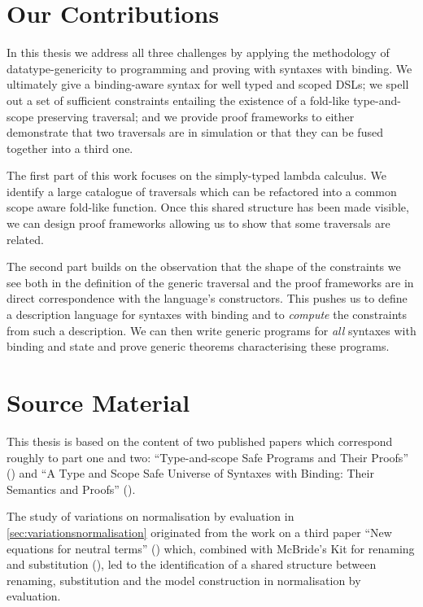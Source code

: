 \section{Our Contributions}

In this thesis we address all three challenges by applying the methodology of
datatype-genericity to programming and proving with syntaxes with binding.
We ultimately give a binding-aware syntax for well typed and scoped DSLs; we
spell out a set of sufficient constraints entailing the existence of a fold-like
type-and-scope preserving traversal; and we provide proof frameworks
to either demonstrate that two traversals are in simulation or that they can be
fused together into a third one.

The first part of this work focuses on the simply-typed lambda calculus. We
identify a large catalogue of traversals which can be refactored into a common
scope aware fold-like function. Once this shared structure has been made
visible, we can design proof frameworks allowing us to show that some traversals
are related.

The second part builds on the observation that the shape of the constraints we
see both in the definition of the generic traversal and the proof frameworks
are in direct correspondence with the language's constructors. This pushes us
to define a description language for syntaxes with binding and to \emph{compute}
the constraints from such a description. We can then write generic programs for
\emph{all} syntaxes with binding and state and prove generic theorems characterising
these programs.

\section{Source Material}

This thesis is based on the content of two published papers which correspond roughly
to part one and two: ``Type-and-scope Safe Programs and Their Proofs'' (\cite{allais2017type})
and ``A Type and Scope Safe Universe of Syntaxes with Binding: Their Semantics and Proofs''
(\cite{generic-syntax}).

The study of variations on normalisation by evaluation in \cref{sec:variationsnormalisation}
originated from the work on a third paper ``New equations for neutral terms''
(\cite{new-equations}) which, combined with McBride's Kit for renaming and substitution
(\citeyear{mcbride2005type}), led to the identification of a shared structure between renaming,
substitution and the model construction in normalisation by evaluation.
